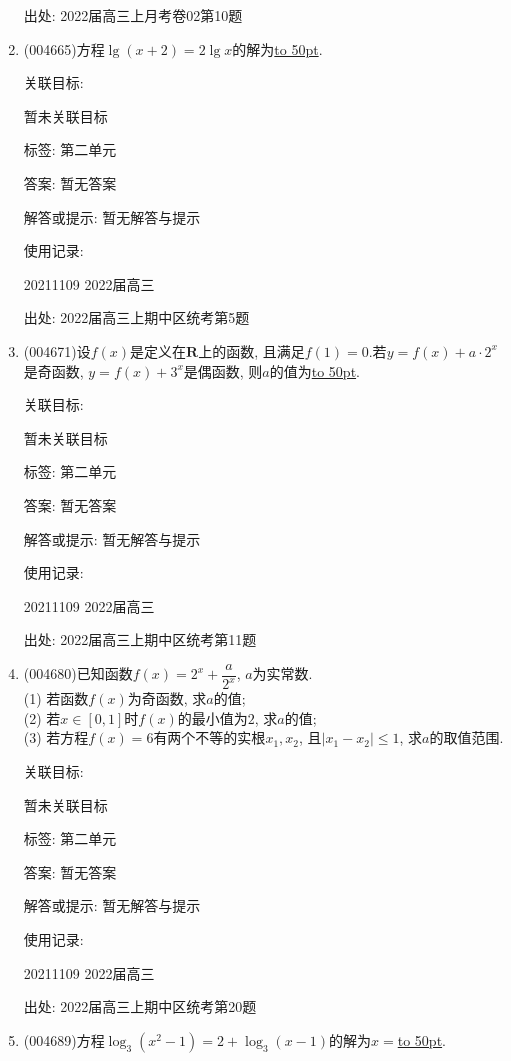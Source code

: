 \documentclass[10pt,a4paper]{article}
\newcommand{\blank}[1]{\underline{\hbox to #1pt{}}}
\begin{document}
\begin{enumerate}[1.]
出处: 2022届高三上月考卷02第10题
\item { (004665)}方程$\lg (x+2)=2\lg x$的解为\blank{50}.


关联目标:

暂未关联目标



标签: 第二单元

答案: 暂无答案

解答或提示: 暂无解答与提示

使用记录:

20211109	2022届高三	


出处: 2022届高三上期中区统考第5题
\item { (004671)}设$f(x)$是定义在$\mathbf{R}$上的函数, 且满足$f(1)=0$.若$y=f(x)+a\cdot 2^x$是奇函数, $y=f(x)+3^x$是偶函数, 则$a$的值为\blank{50}.


关联目标:

暂未关联目标



标签: 第二单元

答案: 暂无答案

解答或提示: 暂无解答与提示

使用记录:

20211109	2022届高三	


出处: 2022届高三上期中区统考第11题
\item { (004680)}已知函数$f(x)=2^x+\dfrac a{2^x}$, $a$为实常数.\\
(1) 若函数$f(x)$为奇函数, 求$a$的值;\\
(2) 若$x\in [0,1]$时$f(x)$的最小值为$2$, 求$a$的值;\\
(3) 若方程$f(x)=6$有两个不等的实根$x_1,x_2$, 且$|x_1-x_2|\le 1$, 求$a$的取值范围.


关联目标:

暂未关联目标



标签: 第二单元

答案: 暂无答案

解答或提示: 暂无解答与提示

使用记录:

20211109	2022届高三			


出处: 2022届高三上期中区统考第20题
\item { (004689)}方程$\log_3(x^2-1)=2+\log_3(x-1)$的解为$x=$\blank{50}.



\end{enumerate}
\end{document}
